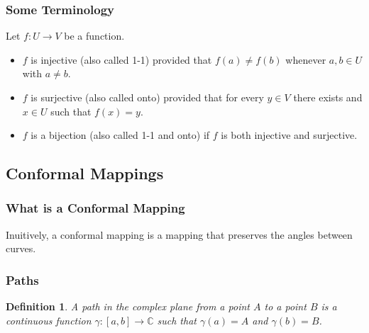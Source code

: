 \documentclass{article}
\newtheorem{definition}{Definition}[section]
\begin{document}
\subsubsection{Some Terminology}
Let $f : U \to V$ be a function.
\begin{itemize}
\item $f$ is injective (also called 1-1) provided that $f(a) \neq f(b)$ whenever $a,b \in U$ with $a \neq b$.
\item $f$ is surjective (also called onto) provided that for every $y \in V$ there exists and $x \in U$ such that $f(x) = y$.
\item $f$ is a bijection (also called 1-1 and onto) if $f$ is both injective and surjective.
\end{itemize}

\subsection{Conformal Mappings}
\subsubsection{What is a Conformal Mapping}
Inuitively, a conformal mapping is a mapping that preserves the angles between curves.
\begin{figure}[h]
\centering
{}
\end{figure}

\subsubsection{Paths}
\begin{definition}
A path in the complex plane from a point $A$ to a point $B$ is a continuous function $\gamma : [a, b] \to \mathbb{C}$ such that $\gamma (a) = A$ and $\gamma (b) = B$.
\end{definition}
\end{document}
